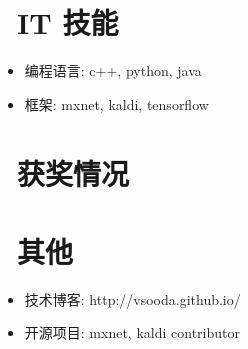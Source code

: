 \documentclass{resume}
\begin{document}
\section{\faCogs\ IT 技能}
\begin{itemize}[parsep=0.5ex]
  \item 编程语言: c++, python, java
  \item 框架: mxnet, kaldi, tensorflow
\end{itemize}

\section{\faHeartO\ 获奖情况}

\section{\faPencilSquare\ 其他}
\begin{itemize}[parsep=0.5ex]
  \item 技术博客: http://vsooda.github.io/
  \item 开源项目: mxnet, kaldi contributor
\end{itemize}
\end{document}
